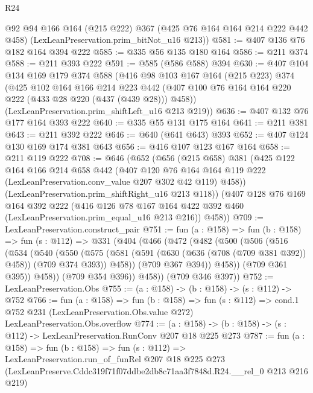 \begin{lexlean}{R24}
\begin{coremodule}
      @92
      @94
      @166
      @164
      (@215 @222)
      @367
      (@425 @76 @164 @164 @214 @222 @442 @458)
      (LexLeanPreservation.prim_bitNot_u16 @213))
@581 := @407 @136 @76 @182 @164 @394 @222
@585 := @335 @56 @135 @180 @164
@586 := @211 @374
@588 := @211 @393 @222
@591 := @585 (@586 @588) @394
@630 := @407
    @104
    @134
    @169
    @179
    @374
    @588
    (@416
      @98
      @103
      @167
      @164
      (@215 @223)
      @374
      (@425
        @102
        @164
        @166
        @214
        @223
        @442
        (@407 @100 @76 @164 @164 @220 @222 (@433 @28 @220 (@437 (@439 @28))) @458))
      (LexLeanPreservation.prim_shiftLeft_u16 @213 @219))
@636 := @407 @132 @76 @177 @164 @393 @222
@640 := @335 @55 @131 @175 @164
@641 := @211 @381
@643 := @211 @392 @222
@646 := @640 (@641 @643) @393
@652 := @407 @124 @130 @169 @174 @381 @643
@656 := @416 @107 @123 @167 @164
@658 := @211 @119 @222
@708 := @646
    (@652
      (@656
        (@215 @658)
        @381
        (@425
          @122
          @164
          @166
          @214
          @658
          @442
          (@407
            @120
            @76
            @164
            @164
            @119
            @222
            (LexLeanPreservation.conv_value @207 @302 @42 @119)
            @458))
        (LexLeanPreservation.prim_shiftRight_u16 @213 @118))
      (@407
        @128
        @76
        @169
        @164
        @392
        @222
        (@416 @126 @78 @167 @164 @422 @392 @460 (LexLeanPreservation.prim_equal_u16 @213 @216))
        @458))
@709 := LexLeanPreservation.construct_pair
@751 := fun (a : @158) =>
  fun (b : @158) =>
  fun (s : @112) =>
  @331
    (@404
      (@466
        (@472
          (@482
            (@500
              (@506
                (@516
                  (@534
                    (@540
                      (@550
                        (@575
                          (@581
                            (@591 (@630 (@636 (@708 (@709 @381 @392)) @458)) (@709 @374 @393))
                            @458))
                        (@709 @367 @394))
                      @458))
                  (@709 @361 @395))
                @458))
            (@709 @354 @396))
          @458))
      (@709 @346 @397))
@752 := LexLeanPreservation.Obs
@755 := (a : @158) -> (b : @158) -> (s : @112) -> @752
@766 := fun (a : @158) =>
  fun (b : @158) =>
  fun (s : @112) =>
  cond.{1} @752 @231 (LexLeanPreservation.Obs.value @272) LexLeanPreservation.Obs.overflow
@774 := (a : @158) -> (b : @158) -> (s : @112) -> LexLeanPreservation.RunConv @207 @18 @225 @273
@787 := fun (a : @158) =>
  fun (b : @158) =>
  fun (s : @112) =>
  LexLeanPreservation.run_of_funRel
    @207
    @18
    @225
    @273
    (LexLeanPreserve.Cddc319f71f07ddbe2db8c71aa3f7848d.R24.__rel_0 @213 @216 @219)
\end{coremodule}
\end{lexlean}
